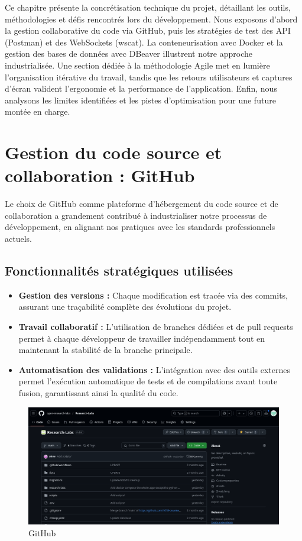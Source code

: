 \documentclass{rapportPfe}
\begin{document}
Ce chapitre présente la concrétisation technique du projet, détaillant les outils, méthodologies et défis rencontrés lors du développement. Nous exposons d’abord la gestion collaborative du code via GitHub, puis les stratégies de test des API (Postman) et des WebSockets (wscat). La conteneurisation avec Docker et la gestion des bases de données avec DBeaver illustrent notre approche industrialisée. Une section dédiée à la méthodologie Agile met en lumière l’organisation itérative du travail, tandis que les retours utilisateurs et captures d’écran valident l’ergonomie et la performance de l’application. Enfin, nous analysons les limites identifiées et les pistes d’optimisation pour une future montée en charge.

\section{Gestion du code source et collaboration : GitHub}

Le choix de GitHub comme plateforme d’hébergement du code source et de collaboration a grandement contribué à industrialiser notre processus de développement, en alignant nos pratiques avec les standards professionnels actuels.

\subsection{Fonctionnalités stratégiques utilisées}

\begin{itemize}
    \item \textbf{Gestion des versions :} Chaque modification est tracée via des commits, assurant une traçabilité complète des évolutions du projet.
    \item \textbf{Travail collaboratif :} L’utilisation de branches dédiées et de pull requests permet à chaque développeur de travailler indépendamment tout en maintenant la stabilité de la branche principale.
    \item \textbf{Automatisation des validations :} L’intégration avec des outils externes permet l’exécution automatique de tests et de compilations avant toute fusion, garantissant ainsi la qualité du code.
\end{itemize}

\FloatBarrier
\begin{figure}[htbp]
    \centering
    \includegraphics[width=1.0\textwidth]{diagrams/ss_02.png}
    \caption{GitHub}
    \label{fig:diagram5}
\end{figure}
\end{document}

